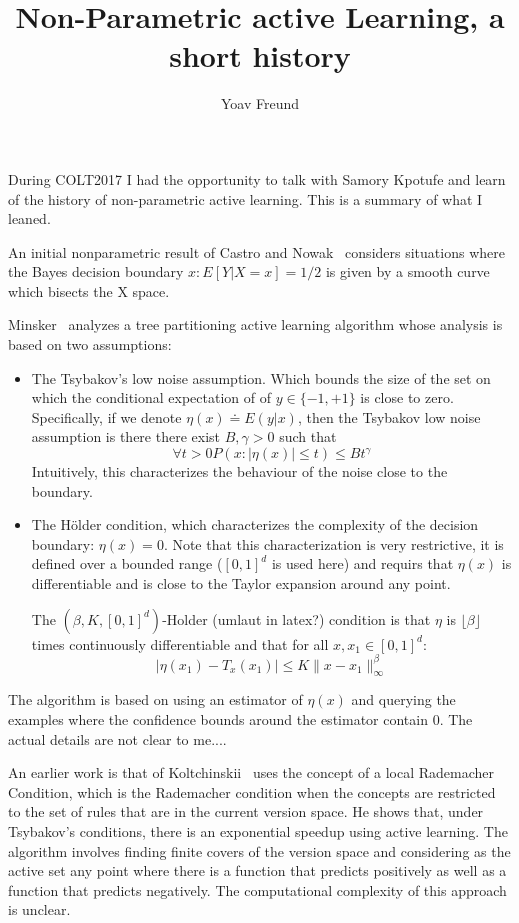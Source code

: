 \documentclass{article}
\title{Non-Parametric active Learning, a short history}
\author{Yoav Freund}
\begin{document}
\maketitle

During COLT2017 I had the opportunity to talk with Samory Kpotufe and
learn of the history of non-parametric active learning. This is a
summary of what I leaned.

An initial nonparametric result of Castro and
Nowak~\cite{castro2008minimax} considers situations where the Bayes
decision boundary ${x : E[Y |X = x] = 1/2}$ is given by a smooth curve
which bisects the X space.

Minsker~\cite{minsker2012plug} analyzes a tree partitioning active
learning algorithm whose analysis is based on two assumptions:

\begin{itemize}
  \item The Tsybakov's low noise assumption. Which bounds the size of the set
    on which the conditional expectation of of $y \in \{-1,+1\}$ is close to
    zero. Specifically, if we denote $\eta(x) \doteq E(y|x)$, then the
    Tsybakov low noise assumption is there there exist $B,\gamma >0$ such
    that
    \[
    \forall t>0 P(x: |\eta(x)|\leq t) \leq B t^{\gamma}
    \]
    Intuitively, this characterizes the behaviour of the noise close
    to the boundary.
  \item
    The H{\"o}lder condition, which characterizes the
    complexity of the decision boundary: $\eta(x)=0$. Note that this
    characterization is very restrictive, it is defined over a bounded
    range  ($[0,1]^d$ is used here) and requirs that $\eta(x)$ is
    differentiable and is close to the Taylor expansion around any point.

    The $(\beta,K,[0,1]^d)$-Holder (umlaut in latex?) condition is
    that $\eta$ is $\lfloor \beta \rfloor$ times continuously
    differentiable and that for all $x,x_1 \in [0,1]^d$:
    \[
    |\eta(x_1)-T_x(x_1)| \leq K \|x-x_1\|_{\infty}^{\beta}
    \]
\end{itemize}

The algorithm is based on using an estimator of $\eta(x)$ and querying
the examples where the confidence bounds around the estimator contain
$0$. The actual details are not clear to me....

An earlier work is that of
Koltchinskii~\cite{koltchinskii2010rademacher} uses the concept of a
local Rademacher Condition, which is the Rademacher condition when the
concepts are restricted to the set of rules that are in the current
version space. He shows that, under Tsybakov's conditions, there is an
exponential speedup using active learning. The algorithm involves
finding finite covers of the version space and considering as the
active set any point where there is a function that predicts
positively as well as a function that predicts negatively.
The computational complexity of this approach is unclear.


{}

\end{document}

